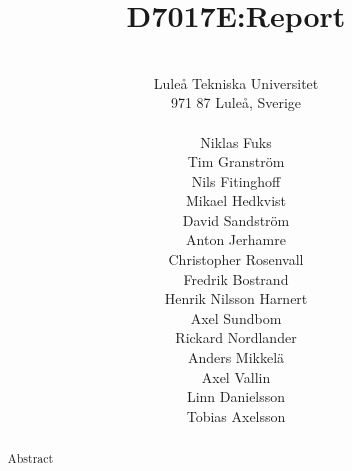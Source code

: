 \documentclass[a4paper,12pt]{article}
\title{D7017E:\@ Report}
\begin{document}
\author{  \\ Luleå Tekniska Universitet\\ 
971 87 Luleå, Sverige\\  
\\ Niklas Fuks
\\ Tim Granström 
\\ Nils Fitinghoff 
\\ Mikael Hedkvist 
\\ David Sandström 
\\ Anton Jerhamre
\\ Christopher Rosenvall
\\ Fredrik Bostrand 
\\ Henrik Nilsson Harnert 
\\ Axel Sundbom 
\\ Rickard Nordlander 
\\ Anders Mikkelä 
\\ Axel Vallin
\\ Linn Danielsson
\\ Tobias Axelsson
}
\maketitle
\thispagestyle{empty}
\newpage
\thispagestyle{empty}  
 \setcounter{page}{1}
\newpage
\thispagestyle{empty}  
 \begin{abstract}
Abstract
 \end{abstract}
\newpage

\tableofcontents{}
\thispagestyle{empty}
 \setcounter{page}{2}
 
 \newpage
 \setcounter{page}{3}

 
 
 
 
 
\end{document}
